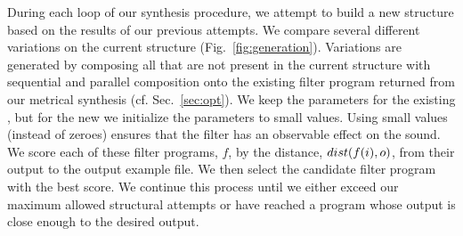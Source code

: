 During each loop of our synthesis procedure, we attempt to build a new structure based on the results of our previous attempts.
We compare several different variations on the current structure (Fig.~\ref{fig:generation}).
Variations are generated by composing all \dspnode that are not present in the current structure with sequential and parallel composition onto the existing filter program returned from our metrical synthesis (cf. Sec.~\ref{sec:opt}).
We keep the parameters for the existing \dspnode, but for the new \dspnode we initialize the parameters to small values.
Using small values (instead of zeroes) ensures that the filter has an observable effect on the sound.
We score each of these filter programs, $f$, by the distance, $dist(f(i), o)$, from their output to the output example file.
We then select the candidate filter program with the best score.
We continue this process until we either exceed our maximum allowed structural attempts or have reached a program whose output is close enough to the desired output.
